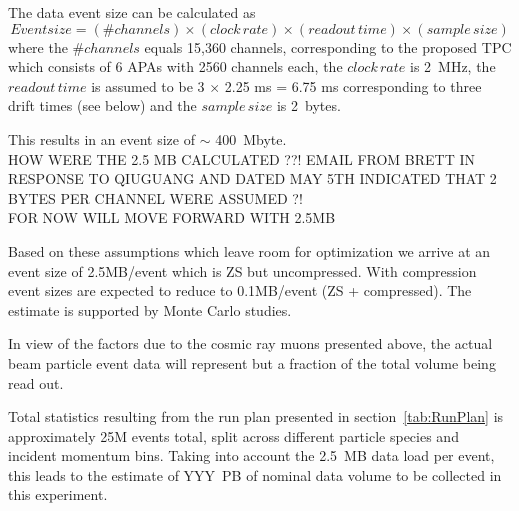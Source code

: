 The data event size can be calculated as
\begin{equation}
  Event size = (\#channels) \times (clock\, rate) \times (readout \, time) \times (sample \, size)
\end{equation}
where the $\# channels$ equals 15,360 channels, corresponding to the proposed TPC which consists of 6 APAs with 2560 channels each, 
the $clock \, rate$ is 2~MHz, the $readout \, time$ is assumed to be 3 $ \times $ 2.25 ms = 6.75 ms corresponding to three drift times (see below) and the $sample \, size$ is 2~bytes.

{\color{red} This results in an event size of $\sim$ 400~Mbyte.\\
HOW WERE THE 2.5 MB CALCULATED ??! EMAIL FROM BRETT IN RESPONSE TO QIUGUANG AND DATED MAY 5TH INDICATED THAT 2 BYTES PER CHANNEL WERE ASSUMED ?!\\
FOR NOW WILL MOVE FORWARD WITH 2.5MB\\}
%

Based on these assumptions which leave room for optimization
we arrive at an event size of 2.5MB/event which is ZS but uncompressed.
With compression event sizes are expected to reduce to 0.1MB/event (ZS + compressed).
%
%
The estimate is supported by Monte Carlo studies.


In view of the factors due to the cosmic ray muons presented above, the actual beam particle event data will represent but a fraction of
the total volume being read out.  

Total statistics resulting from the run plan presented in section~\ref{tab:RunPlan} is approximately 25M events total, 
split across different particle species and incident momentum bins. Taking into account the 2.5~MB data load per event, 
this leads to the estimate of YYY~PB of nominal data volume to be collected in this experiment. 

